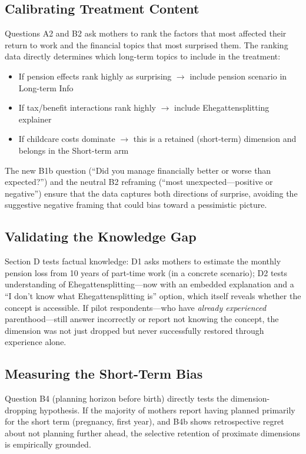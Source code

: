 \documentclass[12pt,a4paper]{article}
\begin{document}
\subsection{Calibrating Treatment Content}

Questions A2 and B2 ask mothers to rank the factors that most affected their return to work and the financial topics that most surprised them. The ranking data directly determines which long-term topics to include in the treatment:

\begin{itemize}[nosep]
    \item If pension effects rank highly as surprising $\rightarrow$ include pension scenario in Long-term Info
    \item If tax/benefit interactions rank highly $\rightarrow$ include Ehegattensplitting explainer
    \item If childcare costs dominate $\rightarrow$ this is a retained (short-term) dimension and belongs in the Short-term arm
\end{itemize}

The new B1b question (``Did you manage financially better or worse than expected?'') and the neutral B2 reframing (``most unexpected---positive or negative'') ensure that the data captures both directions of surprise, avoiding the suggestive negative framing that could bias toward a pessimistic picture.

\subsection{Validating the Knowledge Gap}

Section D tests factual knowledge: D1 asks mothers to estimate the monthly pension loss from 10 years of part-time work (in a concrete scenario); D2 tests understanding of Ehegattensplitting---now with an embedded explanation and a ``I don't know what Ehegattensplitting is'' option, which itself reveals whether the concept is accessible. If pilot respondents---who have \emph{already experienced} parenthood---still answer incorrectly or report not knowing the concept, the dimension was not just dropped but never successfully restored through experience alone.

\subsection{Measuring the Short-Term Bias}

Question B4 (planning horizon before birth) directly tests the dimension-dropping hypothesis. If the majority of mothers report having planned primarily for the short term (pregnancy, first year), and B4b shows retrospective regret about not planning further ahead, the selective retention of proximate dimensions is empirically grounded.
\end{document}
